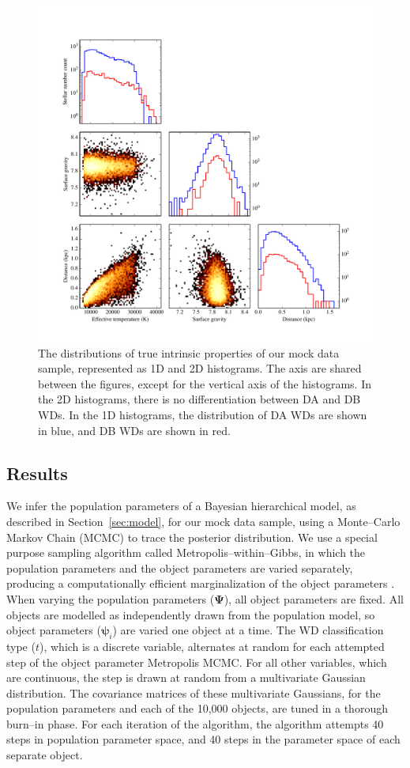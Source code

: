 \documentclass[fleqn,usenatbib]{mnras}
\newcommand{\popp}{\boldsymbol{\Psi}}
\newcommand{\objp}{\boldsymbol{\psi}}
\begin{document}
\begin{figure}
	\includegraphics[width=.9\textwidth]{10000WDs.pdf}
    \caption{The distributions of true intrinsic properties of our mock data sample, represented as 1D and 2D histograms. The axis are shared between the figures, except for the vertical axis of the histograms. In the 2D histograms, there is no differentiation between DA and DB WDs. In the 1D histograms, the distribution of DA WDs are shown in blue, and DB WDs are shown in red.}
    \label{fig:10000WDs}
\end{figure}



\subsection{Results}

We infer the population parameters of a Bayesian hierarchical model, as described in Section~\ref{sec:model}, for our mock data sample, using a Monte--Carlo Markov Chain (MCMC) to trace the posterior distribution. We use a special purpose sampling algorithm called Metropolis--within--Gibbs, in which the population parameters and the object parameters are varied separately, producing a computationally efficient marginalization of the object parameters \citep{BayesianDataAnalysis}. When varying the population parameters ($\popp$), all object parameters are fixed. All objects are modelled as independently drawn from the population model, so object parameters ($\objp_i$) are varied one object at a time. The WD classification type ($t$), which is a discrete variable, alternates at random for each attempted step of the object parameter Metropolis MCMC. For all other variables, which are continuous, the step is drawn at random from a multivariate Gaussian distribution. The covariance matrices of these multivariate Gaussians, for the population parameters and each of the 10,000 objects, are tuned in a thorough burn--in phase. For each iteration of the algorithm, the algorithm attempts 40 steps in population parameter space, and 40 steps in the parameter space of each separate object.
\end{document}

